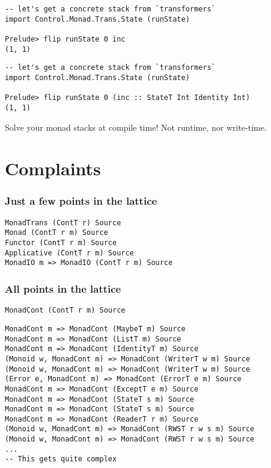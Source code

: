 \documentclass[pdf]{beamer}
\begin{document}
\begin{frame}[fragile]
\begin{lstlisting}
-- let's get a concrete stack from `transformers`
import Control.Monad.Trans.State (runState)

Prelude> flip runState 0 inc 
(1, 1)
\end{lstlisting}
\end{frame}

\begin{frame}[fragile]
\begin{lstlisting}
-- let's get a concrete stack from `transformers`
import Control.Monad.Trans.State (runState)

Prelude> flip runState 0 (inc :: StateT Int Identity Int)
(1, 1)
\end{lstlisting}
\end{frame}

\begin{frame}
  Solve your monad stacks at compile time! \pause Not runtime\pause, nor write-time.
\end{frame}

\section{Complaints}

\begin{frame}[fragile]
  \frametitle{Just a few points in the lattice}
\begin{lstlisting}
MonadTrans (ContT r) Source	 
Monad (ContT r m) Source	 
Functor (ContT r m) Source	 
Applicative (ContT r m) Source	 
MonadIO m => MonadIO (ContT r m) Source	 
\end{lstlisting}
\end{frame}

\begin{frame}[fragile]
  \frametitle{All points in the lattice}
\begin{lstlisting}
MonadCont (ContT r m) Source	 
\end{lstlisting}
  \pause
\begin{lstlisting}
MonadCont m => MonadCont (MaybeT m) Source	 
MonadCont m => MonadCont (ListT m) Source	 
MonadCont m => MonadCont (IdentityT m) Source	 
(Monoid w, MonadCont m) => MonadCont (WriterT w m) Source	 
(Monoid w, MonadCont m) => MonadCont (WriterT w m) Source	 
(Error e, MonadCont m) => MonadCont (ErrorT e m) Source	 
MonadCont m => MonadCont (ExceptT e m) Source	 
MonadCont m => MonadCont (StateT s m) Source	 
MonadCont m => MonadCont (StateT s m) Source	 
MonadCont m => MonadCont (ReaderT r m) Source	 
(Monoid w, MonadCont m) => MonadCont (RWST r w s m) Source	 
(Monoid w, MonadCont m) => MonadCont (RWST r w s m) Source
...
-- This gets quite complex
\end{lstlisting}
\end{frame}
\end{document}
